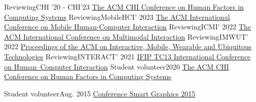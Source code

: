 
\resumeSubHeadingListStartNoLabel
\resumeSubheading
{Reviewing}{CHI '20 - CHI'23}
{\href{https://sigchi.org/}{The ACM CHI Conference on Human Factors in Computing Systems}}{}
\resumeSubheading
{Reviewing}{MobileHCI' 2023}
{\href{https://mobilehci.acm.org/2023/}{The ACM International Conference on Mobile Human-Computer Interaction}}{}
\resumeSubheading
{Reviewing}{ICMI' 2022}
{\href{https://icmi.acm.org/2022/}{The ACM International Conference on Multimodal Interaction}}{}
\resumeSubheading
{Reviewing}{IMWUT' 2022}
{\href{https://dl.acm.org/journal/imwut}{Proceedings of the ACM on Interactive, Mobile, Wearable and Ubiquitous Technologies}}{}
\resumeSubheading
{Reviewing}{INTERACT' 2021}
{\href{https://www.interact2021.org/}{IFIP TC13 International Conference on Human–Computer Interaction}}{}
\resumeSubheading
{Student volunteer}{2020}
{\href{https://sigchi.org/}{The ACM CHI Conference on Human Factors in Computing Systems}}{}

\resumeSubheading
{Student volunteer}{Aug. 2015}
{\href{http://www.smartgraphics.org/sg15/}{Conference Smart Graphics 2015}}{}



\resumeSubHeadingListEnd